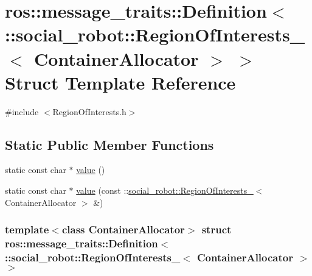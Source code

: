 \hypertarget{structros_1_1message__traits_1_1Definition_3_01_1_1social__robot_1_1RegionOfInterests___3_01ContainerAllocator_01_4_01_4}{
\section{ros::message\_\-traits::Definition$<$ ::social\_\-robot::RegionOfInterests\_\-$<$ ContainerAllocator $>$ $>$ Struct Template Reference}
\label{structros_1_1message__traits_1_1Definition_3_01_1_1social__robot_1_1RegionOfInterests___3_01ContainerAllocator_01_4_01_4}
}


{\ttfamily \#include $<$RegionOfInterests.h$>$}

\subsection*{Static Public Member Functions}
\begin{DoxyCompactItemize}
\item 
static const char $\ast$ \hyperlink{structros_1_1message__traits_1_1Definition_3_01_1_1social__robot_1_1RegionOfInterests___3_01ContainerAllocator_01_4_01_4_a1688b0b335282798011d2e4ae6b193c4}{value} ()
\item 
static const char $\ast$ \hyperlink{structros_1_1message__traits_1_1Definition_3_01_1_1social__robot_1_1RegionOfInterests___3_01ContainerAllocator_01_4_01_4_a9e4b5de6e5de76e5da51c4e6f855a151}{value} (const ::\hyperlink{structsocial__robot_1_1RegionOfInterests__}{social\_\-robot::RegionOfInterests\_\-}$<$ ContainerAllocator $>$ \&)
\end{DoxyCompactItemize}
\subsubsection*{template$<$class ContainerAllocator$>$ struct ros::message\_\-traits::Definition$<$ ::social\_\-robot::RegionOfInterests\_\-$<$ ContainerAllocator $>$ $>$}



